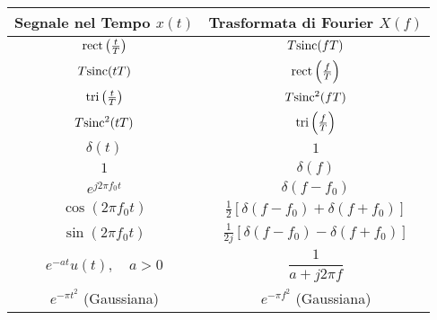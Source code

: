 \begin{center}
\begin{tabular}{c c}
    \toprule
    \textbf{Segnale nel Tempo $x(t)$} & \textbf{Trasformata di Fourier $X(f)$} \\
    \midrule
    $\text{rect}\left(\frac{t}{T}\right)$ & $T \text{sinc}(fT)$ \\
    \addlinespace
    $T \text{sinc}(tT)$ & $\text{rect}\left(\frac{f}{T}\right)$ \\
    \addlinespace
    $\text{tri}\left(\frac{t}{T}\right)$ & $T \text{sinc}^2(fT)$ \\
    \addlinespace
    $T \text{sinc}^2(tT)$ & $\text{tri}\left(\frac{f}{T}\right)$ \\
    \addlinespace
    $\delta(t)$ & $1$ \\
    \addlinespace
    $1$ & $\delta(f)$ \\
    \addlinespace
    $e^{j2\pi f_0 t}$ & $\delta(f - f_0)$ \\
    \addlinespace
    $\cos(2\pi f_0 t)$ & $\frac{1}{2}\left[\delta(f - f_0) + \delta(f + f_0)\right]$ \\
    \addlinespace
    $\sin(2\pi f_0 t)$ & $\frac{1}{2j}\left[\delta(f - f_0) - \delta(f + f_0)\right]$ \\
    \addlinespace
    $e^{-at} u(t), \quad a>0$ & $\dfrac{1}{a + j2\pi f}$ \\
    \addlinespace
    $e^{-\pi t^2}$ (Gaussiana) & $e^{-\pi f^2}$ (Gaussiana) \\
    \bottomrule
\end{tabular}
\end{center}

